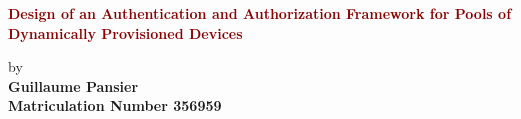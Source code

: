 \documentclass[twoside,11pt,titlepage,a4paper,english,bibliography=totocnumbered,listof=numbered]{scrbook}
\begin{document}
\frontmatter


\begin{titlepage}
	\strut
	\hfill
	\begin{center}
	\vspace{1cm}
		\Huge
		\begin{spacing}{.9}
			\textcolor{DarkRed}{\textbf{Design of an Authentication and Authorization Framework for Pools of Dynamically Provisioned Devices}}\\
		\end{spacing}
		\vspace{0.8cm}
		\large
		by\\
		\vspace{0.8cm} 
		\textbf{Guillaume Pansier}\\
		\vspace{0.8cm} 
		\textbf{Matriculation Number 356959}\\

\end{center}
\end{titlepage}
\end{document}
